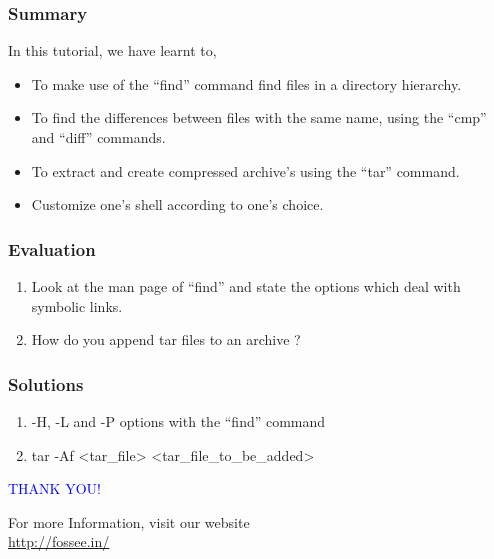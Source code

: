 \documentclass[12pt,compress]{beamer}
\begin{document}
\begin{frame}
\frametitle{Summary}
\label{sec-8}

  In this tutorial, we have learnt to,


\begin{itemize}
\item To make use of the ``find'' command find files in a directory hierarchy.
\item To find the differences between files with the same name, using the
    ``cmp'' and ``diff'' commands.
\item To extract and create compressed archive's using the ``tar'' command.
\item Customize one's shell according to one's choice. 
\end{itemize}
\end{frame}
\begin{frame}[fragile]
\frametitle{Evaluation}
\label{sec-9}


\begin{enumerate}
\item Look at the man page of ``find'' and state the options which
    deal with symbolic links.
\vspace{8pt}
\item How do you append tar files to an archive ?
\end{enumerate}
\end{frame}
\begin{frame}
\frametitle{Solutions}

\begin{enumerate}
\item  -H,  -L  and  -P options with the ``find'' command   
\vspace{15pt}
\item tar -Af <tar\_file> <tar\_file\_to\_be\_added>
\end{enumerate}

\end{frame}
\begin{frame}

  \begin{block}{}
  \begin{center}
  \textcolor{blue}{\Large THANK YOU!} 
  \end{center}
  \end{block}
\begin{block}{}
  \begin{center}
    For more Information, visit our website\\
    \url{http://fossee.in/}
  \end{center}  
  \end{block}
\end{frame}
\end{document}
